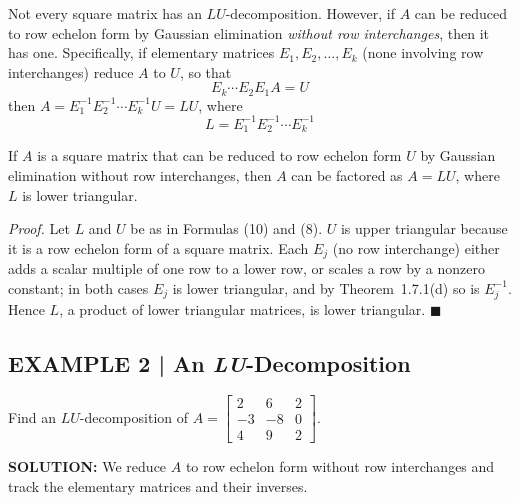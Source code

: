 \documentclass{article}
\begin{document}
Not every square matrix has an $LU$-decomposition. However, if $A$ can be reduced to
row echelon form by Gaussian elimination \emph{without row interchanges}, then it has one.
Specifically, if elementary matrices $E_1,E_2,\ldots,E_k$ (none involving row
interchanges) reduce $A$ to $U$, so that
\[
  E_k\cdots E_2 E_1 A = U \tag{8}
\]
then $A = E_1^{-1}E_2^{-1}\cdots E_k^{-1}U = LU$, where
\[
  L = E_1^{-1}E_2^{-1}\cdots E_k^{-1} \tag{10}
\]

\begin{tcolorbox}[colback=red!4, colframe=red!60!black,
  title={\textbf{Theorem 9.1.1}}, boxrule=0.5mm, arc=3mm]
If $A$ is a square matrix that can be reduced to row echelon form $U$ by Gaussian
elimination without row interchanges, then $A$ can be factored as $A = LU$, where $L$
is lower triangular.
\end{tcolorbox}

\textit{Proof.}
Let $L$ and $U$ be as in Formulas (10) and (8). $U$ is upper triangular because it is
a row echelon form of a square matrix. Each $E_j$ (no row interchange) either adds a
scalar multiple of one row to a lower row, or scales a row by a nonzero constant; in both
cases $E_j$ is lower triangular, and by Theorem~1.7.1(d) so is $E_j^{-1}$. Hence $L$,
a product of lower triangular matrices, is lower triangular. $\blacksquare$

\subsection*{EXAMPLE 2 | An \textit{LU}-Decomposition}

Find an $LU$-decomposition of
$A = \begin{bmatrix}2&6&2\\-3&-8&0\\4&9&2\end{bmatrix}$.

\textbf{SOLUTION:} We reduce $A$ to row echelon form without row interchanges and track
the elementary matrices and their inverses.
\end{document}
